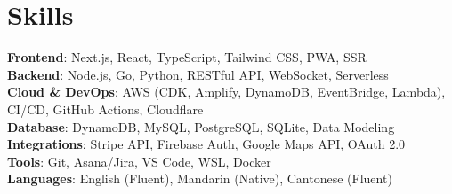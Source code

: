 \documentclass[letterpaper,11pt]{article}
\begin{document}
\section{Skills}
 \begin{itemize}[leftmargin=0.15in, label={}]
    \small{\item{
     \textbf{Frontend}{: Next.js, React, TypeScript, Tailwind CSS, PWA, SSR} \\
     \textbf{Backend}{: Node.js, Go, Python, RESTful API, WebSocket, Serverless} \\
     \textbf{Cloud \& DevOps}{: AWS (CDK, Amplify, DynamoDB, EventBridge, Lambda), CI/CD, GitHub Actions, Cloudflare} \\
     \textbf{Database}{: DynamoDB, MySQL, PostgreSQL, SQLite, Data Modeling} \\
     \textbf{Integrations}{: Stripe API, Firebase Auth, Google Maps API, OAuth 2.0} \\
     \textbf{Tools}{: Git, Asana/Jira, VS Code, WSL, Docker} \\
     \textbf{Languages}{: English (Fluent), Mandarin (Native), Cantonese (Fluent)}
    }}
 \end{itemize}

\end{document}
